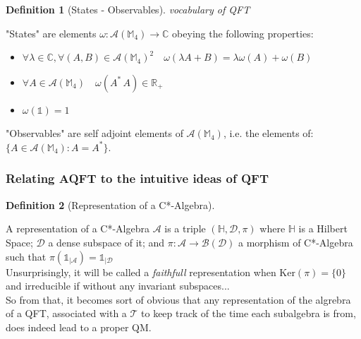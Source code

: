 \documentclass[a4paper,11pt]{article}
\numberwithin{equation}{section}
\theoremstyle{definition}
\newtheorem{definition}{Definition}
\newtheorem{comment}{Comment}
\begin{document}
\begin{definition}[States - Observables] \emph{vocabulary of QFT}

"States" are elements $\omega: \mathcal{A}(\mathbb{M}_4)\to\mathbb{C}$ obeying the following properties:
\begin{itemize}
    \item $\forall \lambda\in\mathbb{C}, \forall(A,B)\in\mathcal{A}(\mathbb{M}_4)^2\quad \omega(\lambda A+B)=\lambda \omega(A)+\omega(B)$
    \item $\forall A \in \mathcal{A}(\mathbb{M}_4)\quad \omega(A^*\, A)\in \mathbb{R}_+$
    \item $\omega(\mathds{1})=1$
\end{itemize}

"Observables" are self adjoint elements of $\mathcal{A}(\mathbb{M}_4)$, i.e. the elements of: $\{A \in\mathcal{A}(\mathbb{M}_4):A=A^*\}$.
\end{definition}

\subsubsection{Relating AQFT to the intuitive ideas of QFT}

\begin{definition}[Representation of a C*-Algebra]$\quad$

    A representation of a C*-Algebra $\mathcal{A}$ is a triple $(\mathbb{H},\mathcal{D},\pi)$ where $\mathbb{H}$ is a Hilbert Space; $\mathcal{D}$ a dense subspace of it; and $\pi : \mathcal{A}\to\mathcal{B}(\mathcal{D})$ a morphism of C*-Algebra such that $\pi(\mathds{1}_{|\mathcal{A}})=\mathds{1}_{|\mathcal{D}}$\\
    Unsurprisingly, it will be called a \emph{faithfull} representation when $\mathrm{Ker}(\pi)=\{0\}$ and irreducible if without any invariant subspaces...
    \\ So from that, it becomes sort of obvious that any representation of the algrebra of a QFT, associated with a $\mathcal{T}$ to keep track of the time each subalgebra is from, does indeed lead to a proper QM.
\end{definition}
\end{document}
